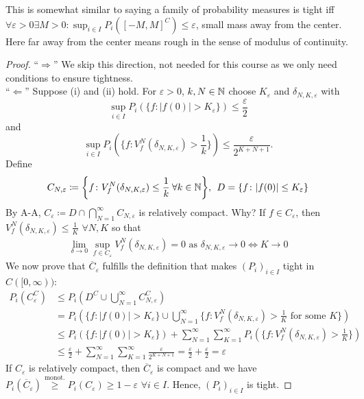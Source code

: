 This is somewhat similar to saying a family of probability measures is tight iff $\forall \varepsilon > 0 \exists M>0 \colon \sup_{i\in I}P_i \left( [-M,M]^C \right) \leq \varepsilon$, small mass away from the center. Here far away from the center means rough in the sense of modulus of continuity.
\begin{proof}
	\enquote{$\Rightarrow$} We skip this direction, not needed for this course as we only need conditions to ensure tightness.\\
	\enquote{$\Leftarrow$} Suppose (i) and (ii) hold. For $\varepsilon > 0$, $k,N\in\mathbb{N}$ choose $K_{\varepsilon}$ and $\delta_{N,K,\varepsilon}$ with $$\sup_{i\in I} P_i \left( \{ f\colon \lvert f(0)\rvert > K_{\varepsilon}\}\right) \leq \frac{\varepsilon}{2}$$ and $$ \sup_{i\in I} P_i \left( \bigg\{ f \colon V_f^N(\delta_{N,K,\varepsilon})>\frac{1}{k}\bigg\}\right) \leq \frac{\varepsilon}{2^{K+N+1}}.$$ Define 
	\begin{align*}
		C_{N,\varepsilon} \coloneqq \bigg\{ f \colon V_f^N(\delta_{N,K,\varepsilon})\leq \frac{1}{k}\: \forall k \in \mathbb{N} \bigg\}, \:\: D = \{f\colon \lvert f(0)\rvert \leq K_{\varepsilon}\}
	\end{align*}
	By A-A, $C_{\varepsilon} \coloneqq D \cap \bigcap_{N=1}^{\infty} C_{N,\varepsilon}$ is relatively compact. Why? If $f \in C_{\varepsilon}$, then $V_f^N(\delta_{N,K,\varepsilon})\leq \frac{1}{K}$ $\forall N,K$ so that 
	\begin{align*}
		\lim_{\delta\to 0} \sup_{f\in C_{\varepsilon}} V_f^N(\delta_{N,K,\varepsilon}) = 0 \text{ as } \delta_{N,K,\varepsilon}\to 0 \Leftrightarrow K \to 0
	\end{align*}
	We now prove that $\overline{C}_{\varepsilon}$ fulfills the definition that makes $(P_i)_{i\in I}$ tight in $C([0,\infty))$:
	\begin{align*}
		P_i(C_{\varepsilon}^C) &\leq P_i \left( D^C \cup \bigcup_{N=1}^{\infty} C_{N,\varepsilon}^C\right) \\
				&= P_i \left( \{ f \colon \lvert f(0) \rvert > K_{\varepsilon}\} \cup \bigcup_{N=1}^{\infty}\bigg\{f\colon V_f^N(\delta_{N,K,\varepsilon})>\frac{1}{K} \text{ for some }K\bigg\}\right) \\
				&\leq P_i \left( \{ f\colon \lvert f(0)\rvert >K_{\varepsilon} \}\right) + \sum_{N=1}^{\infty} \sum_{K=1}^{\infty} P_i \left( \bigg\{ f \colon V_f^N(\delta_{N,K,\varepsilon})>\frac{1}{K}\bigg\}\right) \\
				&\leq \frac{\varepsilon}{2} + \sum_{N=1}^{\infty} \sum_{K=1}^{\infty} \frac{\varepsilon}{2^{K+N+1}} = \frac{\varepsilon}{2} + \frac{\varepsilon}{2} = \varepsilon
	\end{align*}
	If $C_{\varepsilon}$ is relatively compact, then $\overline{C}_{\varepsilon}$ is compact and we have $P_i(\overline{C}_{\varepsilon}) \overset{\text{monot.}}{\geq} P_i \left( C_{\varepsilon}\right) \geq 1 - \varepsilon$ $\forall i \in I$. Hence, $(P_i)_{i\in I}$ is tight.
\end{proof}
